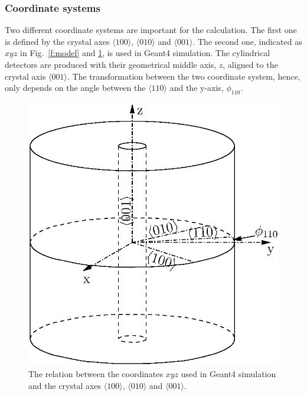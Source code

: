 \documentclass[epj]{svjour}
\begin{document}
\subsubsection{Coordinate systems} 
\label{s:xyz}
Two different coordinate systems are important for the
calculation. The first one is defined by the crystal axes $\langle 100
\rangle$, $\langle 010 \rangle$ and $\langle 001 \rangle$. The second
one, indicated as $xyz$ in Fig.~\ref{f:model} and \ref{f:coo}, is used
in Geant4 simulation. The cylindrical detectors are produced with
their geometrical middle axis, $z$, aligned to the crystal axis
$\langle 001 \rangle$. The transformation between the two coordinate
system, hence, only depends on the angle between the $\langle 110
\rangle$ and the y-axis, $\phi_{110}$.
\begin{figure}[htpb]
\centering
\includegraphics[width=0.55\linewidth]{coordins}
\caption{The relation between the coordinates $xyz$ used in Geant4
simulation and the crystal axes $\langle 100 \rangle$, $\langle 010
\rangle$ and $\langle 001 \rangle$.}
\label{f:coo} 
\end{figure} 
 
\end{document}
